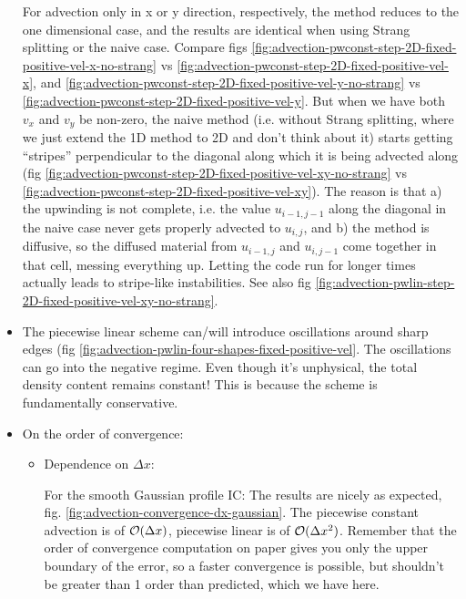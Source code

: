 \begin{itemize}
		For advection only in x or y direction, respectively, the method reduces to the one dimensional case, and the results are identical when using Strang splitting or the naive case.
		Compare figs \ref{fig:advection-pwconst-step-2D-fixed-positive-vel-x-no-strang} vs \ref{fig:advection-pwconst-step-2D-fixed-positive-vel-x}, and \ref{fig:advection-pwconst-step-2D-fixed-positive-vel-y-no-strang} vs \ref{fig:advection-pwconst-step-2D-fixed-positive-vel-y}.
		But when we have both $v_x$ and $v_y$ be non-zero, the naive method (i.e. without Strang splitting, where we just extend the 1D method to 2D and don't think about it) starts getting ``stripes'' perpendicular to the diagonal along which it is being advected along (fig \ref{fig:advection-pwconst-step-2D-fixed-positive-vel-xy-no-strang} vs \ref{fig:advection-pwconst-step-2D-fixed-positive-vel-xy}).
		The reason is that a) the upwinding is not complete, i.e. the value $u_{i-1, j-1}$ along the diagonal in the naive case never gets properly advected to $u_{i, j}$, and b) the method is diffusive, so the diffused material from $u_{i-1, j}$ and $u_{i, j-1}$ come together in that cell, messing everything up.
		Letting the code run for longer times actually leads to stripe-like instabilities. 
		See also fig \ref{fig:advection-pwlin-step-2D-fixed-positive-vel-xy-no-strang}.



			
		
		
		
		


    \item The piecewise linear scheme can/will introduce oscillations around sharp edges (fig \ref{fig:advection-pwlin-four-shapes-fixed-positive-vel}. 
            The oscillations can go into the negative regime. 
            Even though it's unphysical, the total density content remains constant!
            This is because the scheme is fundamentally conservative.
            
            
            
    \item On the order of convergence:
     
     	
		\begin{itemize}
  			\item Dependence on $\Delta x$:
				
				For the smooth Gaussian profile IC: The results are nicely as expected, fig. \ref{fig:advection-convergence-dx-gaussian}.
				The piecewise constant advection is of $\mathcal{O}(\Delta x)$, piecewise linear is of $\mathcal{O}(\Delta x^2)$.
				Remember that the order of convergence computation on paper gives you only the upper boundary of the error, so a faster convergence is possible, but shouldn't be greater than 1 order than predicted, which we have here.
				

\end{itemize}
\end{itemize}
